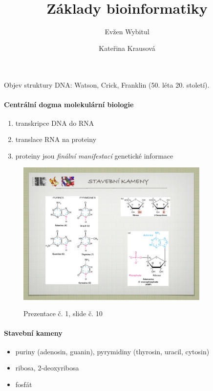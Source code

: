 \documentclass[DIV=8]{scrreprt}
\title{Základy bioinformatiky}
\author{Evžen Wybitul \and Kateřina Krausová}
\begin{document}
\begin{titlepage}
\maketitle
\end{titlepage}
\tableofcontents


Objev struktury DNA: Watson, Crick, Franklin (50. léta 20. století).

\paragraph{Centrální dogma molekulární biologie}
\begin{enumerate}[nosep]
    \item transkripce DNA do RNA
    \item translace RNA na proteiny
    \item proteiny jsou \emph{finální manifestací} genetické informace
\end{enumerate}



\begin{figure}
    \caption{Prezentace č. 1, slide č. 10}
    \includegraphics[width=0.85\textwidth]{slides-1/slide-10.jpg}
    \centering
    \label{slides-1-slide-10}
\end{figure}

\paragraph{Stavební kameny}
\begin{itemize}[nosep]
    \item puriny (adenosin, guanin), pyrymidiny (thyrosin, uracil, cytosin)
    \item ribosa, 2-deoxyribosa
    \item fosfát
\end{itemize}
\end{document}
